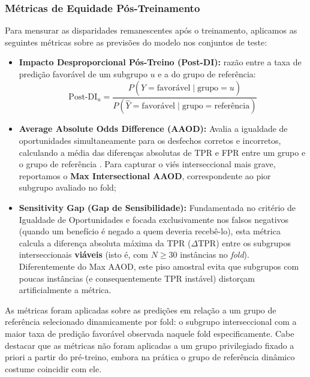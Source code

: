 \subsubsection{Métricas de Equidade Pós-Treinamento}\label{subsec:metricas_postreino}

Para mensurar as disparidades remanescentes após o treinamento, aplicamos as seguintes métricas sobre as previsões do modelo nos conjuntos de teste:

\begin{itemize}
    \item \textbf{Impacto Desproporcional Pós-Treino (Post-DI):} razão entre a taxa de predição favorável de um subgrupo $u$ e a do grupo de referência:
    \begin{equation}
        \text{Post-DI}_u = \frac{P(\hat{Y} = \text{favorável} \mid \text{grupo} = u)}{P(\hat{Y} = \text{favorável} \mid \text{grupo} = \text{referência})}
    \end{equation}

    \item \textbf{Average Absolute Odds Difference (AAOD):} Avalia a igualdade de oportunidades simultaneamente para os desfechos corretos e incorretos, calculando a média das diferenças absolutas de TPR e FPR entre um grupo e o grupo de referência \cite{bellamy2018aif360}. Para capturar o viés interseccional mais grave, reportamos o \textbf{Max Intersectional AAOD}, correspondente ao pior subgrupo avaliado no fold;

    \item \textbf{Sensitivity Gap (Gap de Sensibilidade):} Fundamentada no critério de Igualdade de Oportunidades \cite{hardt2016equality} e focada exclusivamente nos falsos negativos (quando um benefício é negado a quem deveria recebê-lo), esta métrica calcula a diferença absoluta máxima da TPR ($\Delta\text{TPR}$) entre os subgrupos interseccionais \textbf{viáveis} (isto é, com $N \geq 30$ instâncias no \textit{fold}). Diferentemente do Max AAOD, este piso amostral evita que subgrupos com poucas instâncias (e consequentemente TPR instável) distorçam artificialmente a métrica.
\end{itemize}

As métricas foram aplicadas sobre as predições em relação a um grupo de referência selecionado dinamicamente por fold: o subgrupo interseccional com a maior taxa de predição favorável observada naquele fold especificamente. Cabe destacar que as métricas não foram aplicadas a um grupo privilegiado fixado a priori a partir do pré-treino, embora na prática o grupo de referência dinâmico costume coincidir com ele.

